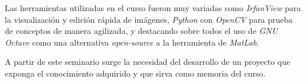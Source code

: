 Las herramientas utilizadas en el curso fueron muy variadas como \textit{IrfanView} para la visualización y edición rápida de imágenes, \textit{Python} con \textit{OpenCV} para prueba de conceptos de manera agilizada, y destacando sobre todos el uso de \textit{GNU Octave} como una alternativa \textit{open-source} a la herramienta de \textit{MatLab}.

A partir de este seminario surge la necesidad del desarrollo de un proyecto que exponga el conocimiento adquirido y que sirva como memoria del curso.